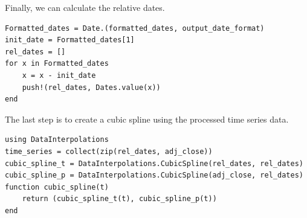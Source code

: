 \documentclass[a4paper,11pt,titlepage]{article}
\theoremstyle{definition}
\theoremstyle{plain}
\theoremstyle{remark}
\begin{document}
Finally, we can calculate the relative dates.
\begin{verbatim}
Formatted_dates = Date.(formatted_dates, output_date_format)
init_date = Formatted_dates[1]
rel_dates = []
for x in Formatted_dates
    x = x - init_date
    push!(rel_dates, Dates.value(x))
end
\end{verbatim}

The last step is to create a cubic spline using the processed time series data.
\begin{verbatim}
using DataInterpolations
time_series = collect(zip(rel_dates, adj_close))
cubic_spline_t = DataInterpolations.CubicSpline(rel_dates, rel_dates)
cubic_spline_p = DataInterpolations.CubicSpline(adj_close, rel_dates)
function cubic_spline(t)
    return (cubic_spline_t(t), cubic_spline_p(t))
end
\end{verbatim}
\end{document}
